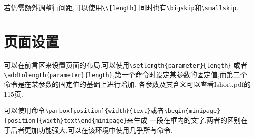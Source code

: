 \documentclass[a4paper,11pt]{article}%
\begin{document}
若仍需额外调整行间距,可以使用\verb|\\[length]|.同时也有\verb|\bigskip|和\verb|\smallskip|.
\section{页面设置}
可以在前言区来设置页面的布局.可以使用\verb|\setlength{parameter}{length}|
或者\verb|\addtolength{parameter}{length}|,第一个命令时设定某参数的固定值,而第二个命令是在某参数的固定值的基础上进行增加.
各参数及其含义可以查看Ishort.pdf的115页.

可以使用命令\verb|\parbox[position]{width}{text}|或者\verb|\begin{minipage}[position]{width}text\end{minipage}|来生成
一段在框内的文字.两者的区别在于后者更加功能强大,可以在该环境中使用几乎所有命令.
\end{document}
